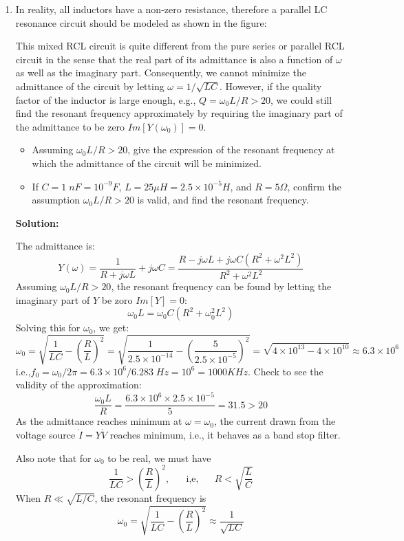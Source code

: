 \begin{enumerate}
\item In reality, all inductors have a non-zero resistance, therefore a 
parallel LC resonance circuit should be modeled as shown in the figure:


This mixed RCL circuit is quite different from the pure series or parallel 
RCL circuit in the sense that the real part of its admittance is also a function
of $\omega$ as well as the imaginary part. Consequently, we cannot minimize 
the admittance of the circuit by letting $\omega=1/\sqrt{LC}$. However, if the
quality factor of the inductor is large enough, e.g., $Q=\omega_0 L/R > 20$, 
we could still find the resonant frequency approximately by requiring the 
imaginary part of the admittance to be zero $Im[Y(\omega_0)]=0$.

\begin{itemize}
\item Assuming $\omega_0 L/R >20$, give the expression of the resonant 
  frequency at which the admittance of the circuit will be minimized.  

\item If $C=1\;nF=10^{-9}F$, $L=25 \mu H=2.5\times 10^{-5}H$, and 
  $R=5\Omega$, confirm the assumption $\omega_0 L/R >20$ is valid, and find 
  the resonant frequency.
\end{itemize}

 {\bf Solution:} 
 
 The admittance is:
 \[ Y(\omega)=\frac{1}{R+j\omega L}+j\omega C
    =\frac{R-j\omega L+j\omega C(R^2+\omega^2L^2)}{R^2+\omega^2L^2}
 \]
 Assuming $\omega_0L/R>20$, the resonant frequency can be found by letting
 the imaginary part of $Y$ be zoro $Im[Y]=0$:
 \[ \omega_0 L=\omega_0 C(R^2+\omega_0^2L^2)	\]
 Solving this for $\omega_0$, we get:
 \[ \omega_0=\sqrt{\frac{1}{LC}-(\frac{R}{L})^2}
    =\sqrt{\frac{1}{2.5\times 10^{-14}}-(\frac{5}{2.5\times 10^{-5}})^2}
    =\sqrt{4\times 10^{13}-4\times 10^{10}}\approx 6.3\times 10^6 \]
 i.e.,$f_0=\omega_0/2\pi=6.3\times 10^6/6.283 \;Hz=10^6=1000 KHz$.
Check to see the validity of the approximation:
 \[ \frac{\omega_0L}{R}=\frac{6.3\times 10^6\times 2.5\times 10^{-5}}{5}=31.5 >20 \]
 As the admittance reaches minimum at $\omega=\omega_0$, the current drawn
 from the voltage source $\dot{I}=Y\dot{V}$ reaches minimum, i.e., it 
 behaves as a band stop filter.
  
   Also note that for $\omega_0$ to be real, we must have
   \[	\frac{1}{LC} > (\frac{R}{L})^2, \;\;\;\;\;\;\mbox{i,e,}
   	\;\;\;\;\;\;R<\sqrt{\frac{L}{C}}	\]
   When $R \ll \sqrt{L/C}$, the resonant frequency is
   \[
   \omega_0=\sqrt{\frac{1}{LC}-(\frac{R}{L})^2}\approx \frac{1}{\sqrt{LC}}	
   \]


\end{enumerate}
